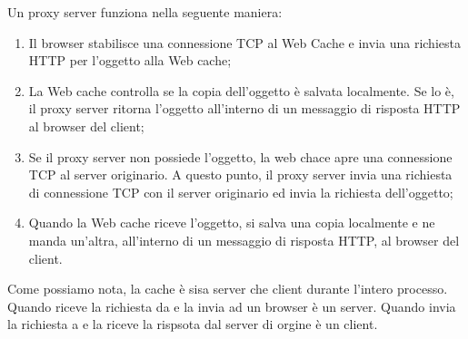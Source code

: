 \documentclass{book}
\begin{document}
Un proxy server funziona nella seguente maniera:
\begin{enumerate}
  \item Il browser stabilisce una connessione TCP al Web Cache e invia una
  richiesta HTTP per l'oggetto alla Web cache;
  
  \item La Web cache controlla se la copia dell'oggetto {\`e} salvata
  localmente. Se lo {\`e}, il proxy server ritorna l'oggetto all'interno di un
  messaggio di risposta HTTP al browser del client;
  
  \item Se il proxy server non possiede l'oggetto, la web chace apre una
  connessione TCP al server originario. A questo punto, il proxy server invia
  una richiesta di connessione TCP con il server originario ed invia la
  richiesta dell'oggetto;
  
  \item Quando la Web cache riceve l'oggetto, si salva una copia localmente e
  ne manda un'altra, all'interno di un messaggio di risposta HTTP, al browser
  del client.
\end{enumerate}
{}

Come possiamo nota, la cache {\`e} sisa server che client durante l'intero
processo. Quando riceve la richiesta da e la invia ad un browser {\`e} un
server. Quando invia la richiesta a e la riceve la rispsota dal server di
orgine {\`e} un client.
\end{document}
